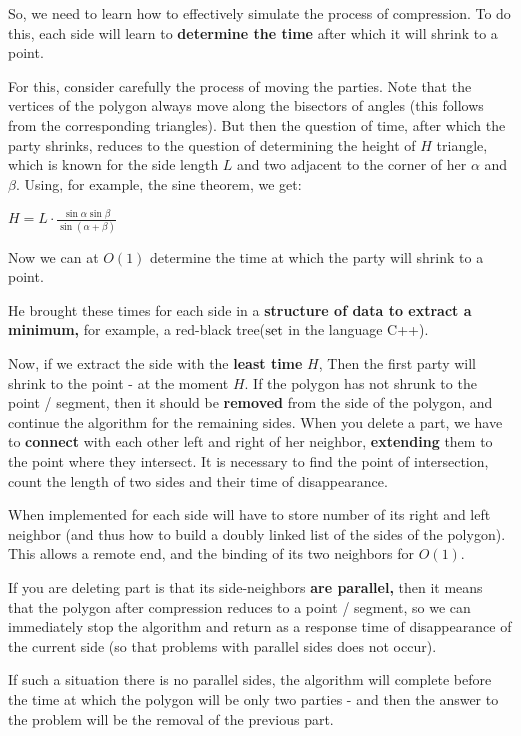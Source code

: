 So, we need to learn how to effectively simulate the process of compression. To do this, each side will learn to \textbf{determine the time} after which it will shrink to a point.

For this, consider carefully the process of moving the parties. Note that the vertices of the polygon always move along the bisectors of angles (this follows from the corresponding triangles). But then the question of time, after which the party shrinks, reduces to the question of determining the height of $H$ triangle, which is known for the side length $L$ and two adjacent to the corner of her $\alpha$ and $\beta$. Using, for example, the sine theorem, we get:

$H=L\cdot\frac{\sin\alpha\sin\beta}{\sin(\alpha+\beta)}$ 

Now we can at $O (1)$ determine the time at which the party will shrink to a point.

He brought these times for each side in a \textbf{structure of data to extract a minimum,} for example, a red-black tree($\rm set$ in the language C++).

Now, if we extract the side with the \textbf{least time} \textbf{$H$}, Then the first party will shrink to the point - at the moment $H$. If the polygon has not shrunk to the point / segment, then it should be \textbf{removed} from the side of the polygon, and continue the algorithm for the remaining sides. When you delete a part, we have to \textbf{connect} with each other left and right of her neighbor, \textbf{extending} them to the point where they intersect. It is necessary to find the point of intersection, count the length of two sides and their time of disappearance.

When implemented for each side will have to store number of its right and left neighbor (and thus how to build a doubly linked list of the sides of the polygon). This allows a remote end, and the binding of its two neighbors for $O (1)$.

If you are deleting part is that its side-neighbors \textbf{are parallel,} then it means that the polygon after compression reduces to a point / segment, so we can immediately stop the algorithm and return as a response time of disappearance of the current side (so that problems with parallel sides does not occur).

If such a situation there is no parallel sides, the algorithm will complete before the time at which the polygon will be only two parties - and then the answer to the problem will be the removal of the previous part.

